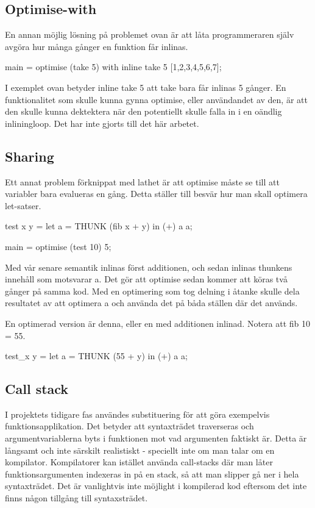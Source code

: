 \documentclass[Rapport]{subfiles}
\begin{document}
\subsection{Optimise-with}
En annan möjlig lösning på problemet ovan är att låta programmeraren själv avgöra hur
många gånger en funktion får inlinas.

\begin{codeEx}
main = optimise (take 5) with { inline take 5 } [1,2,3,4,5,6,7];
\end{codeEx}

I exemplet ovan betyder inline take 5 att take bara får inlinas 5 gånger.
En funktionalitet som skulle kunna gynna optimise, eller användandet av den,
är att den skulle kunna dektektera när den potentiellt skulle falla in i en
oändlig inliningloop. Det har inte gjorts till det här arbetet.

\subsection{Sharing}
Ett annat problem förknippat med lathet är att optimise måste se till att variabler bara 
evalueras en gång. Detta ställer till besvär hur man skall optimera let-satser.

\begin{codeEx}
test x y = let
    { a = THUNK (fib x + y)
    } in (+) a a;

main = optimise (test 10) 5;
\end{codeEx}

Med vår senare semantik inlinas först additionen, och sedan inlinas thunkens innehåll
som motsvarar a. Det gör att optimise sedan kommer att
köras två gånger på samma kod. Med en optimering som tog delning i åtanke 
skulle dela resultatet av att optimera a och använda det på båda ställen där det används.

En optimerad version är denna, eller en med additionen inlinad. Notera att fib 10 = 55.

\begin{codeEx}
test_x y = let
    { a = THUNK (55 + y)
    } in (+) a a;
\end{codeEx}

\subsection{Call stack}

I projektets tidigare fas användes substituering för att göra exempelvis funktionsapplikation.
Det betyder att syntaxträdet traverseras och argumentvariablerna byts i funktionen
mot vad argumenten faktiskt är. Detta är långsamt och inte särskilt realistiskt - 
speciellt inte om man talar om en kompilator. Kompilatorer kan istället använda call-stacks
där man låter funktionsargumenten indexeras in på en stack, så att man slipper
gå ner i hela syntaxträdet. Det är vanlightvis inte möjlight i kompilerad kod eftersom
det inte finns någon tillgång till syntaxsträdet.
\end{document}
